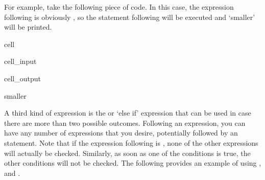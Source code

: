 \documentclass[letterpaper,10pt,english]{jupyterBook}
\begin{document}
\sphinxAtStartPar
For example, take the following piece of code. In this case, the expression following  is obviously , so the statement following  will be executed and ‘smaller’ will be printed.

\begin{sphinxuseclass}{cell}\begin{sphinxVerbatimInput}

\begin{sphinxuseclass}{cell_input}
\begin{sphinxVerbatim}[commandchars=\\\{\}]
   
\end{sphinxVerbatim}

\end{sphinxuseclass}\end{sphinxVerbatimInput}
\begin{sphinxVerbatimOutput}

\begin{sphinxuseclass}{cell_output}
\begin{sphinxVerbatim}[commandchars=\\\{\}]
smaller
\end{sphinxVerbatim}

\end{sphinxuseclass}\end{sphinxVerbatimOutput}

\end{sphinxuseclass}
\sphinxAtStartPar
A third kind of expression is the  or ‘else if’ expression that can be used in case there are more than two possible outcomes. Following an  expression, you can have any number of  expressions that you desire, potentially followed by an  statement. Note that if the expression following  is , none of the other expressions will actually be checked. Similarly, as soon as one of the  conditions is true, the other conditions will not be checked. The following provides an example of using ,  and .
\end{document}
